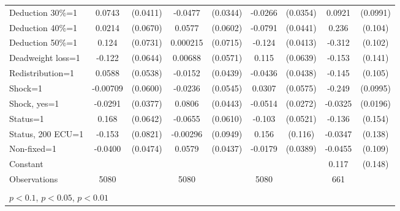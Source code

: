 \begin{tabular}{l|cccccc|cc}
Deduction 30\%=1&   0.0743\sym{*}  & (0.0411)&  -0.0477         & (0.0344)&  -0.0266         & (0.0354)&   0.0921         & (0.0991)\\
Deduction 40\%=1&   0.0214         & (0.0670)&   0.0577         & (0.0602)&  -0.0791\sym{*}  & (0.0441)&    0.236\sym{**} &  (0.104)\\
Deduction 50\%=1&    0.124\sym{*}  & (0.0731)& 0.000215         & (0.0715)&   -0.124\sym{***}& (0.0413)&   -0.312\sym{***}&  (0.102)\\
Deadweight loss=1&   -0.122\sym{*}  & (0.0644)&  0.00688         & (0.0571)&    0.115\sym{*}  & (0.0639)&   -0.153         &  (0.141)\\
Redistribution=1&   0.0588         & (0.0538)&  -0.0152         & (0.0439)&  -0.0436         & (0.0438)&   -0.145         &  (0.105)\\
Shock=1         & -0.00709         & (0.0600)&  -0.0236         & (0.0545)&   0.0307         & (0.0575)&   -0.249\sym{**} & (0.0995)\\
Shock, yes=1    &  -0.0291         & (0.0377)&   0.0806\sym{*}  & (0.0443)&  -0.0514\sym{*}  & (0.0272)&  -0.0325         & (0.0196)\\
Status=1        &    0.168\sym{***}& (0.0642)&  -0.0655         & (0.0610)&   -0.103\sym{**} & (0.0521)&   -0.136         &  (0.154)\\
Status, 200 ECU=1&   -0.153\sym{*}  & (0.0821)& -0.00296         & (0.0949)&    0.156         &  (0.116)&  -0.0347         &  (0.138)\\
Non-fixed=1     &  -0.0400         & (0.0474)&   0.0579         & (0.0437)&  -0.0179         & (0.0389)&  -0.0455         &  (0.109)\\
Constant        &                  &         &                  &         &                  &         &    0.117         &  (0.148)\\
\hline
Observations    &     5080         &         &     5080         &         &     5080         &         &      661         &         \\
\hline\hline
\multicolumn{9}{p{16cm}}{\tiny }\\
\multicolumn{9}{l}{\tiny \sym{*} \(p<0.1\), \sym{**} \(p<0.05\), \sym{***} \(p<0.01\)}\\
\end{tabular}
